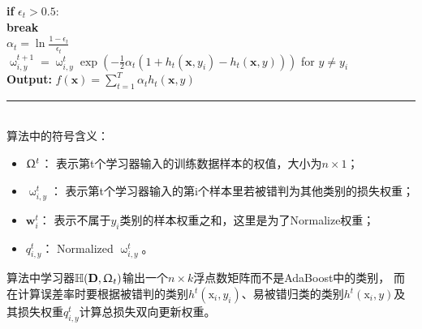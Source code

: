 \documentclass[a4paper]{article}
\begin{document}
					\hspace*{48pt}	\textbf{if} $\epsilon_t > 0.5$:\\
					\hspace*{64pt}	\textbf{break}\\
					\hspace*{48pt}	$\alpha_t = \ln\frac{1-\epsilon_t}{\epsilon_t}$\\
					\hspace*{48pt}	$\upomega_{i,y}^{t+1} = \upomega_{i,y}^t\exp(-\frac{1}{2}\alpha_t(1+h_t(\textbf{x},y_i)-h_t(\textbf{x},y)))$ for $y\neq y_i$\\
			\textbf{Output:} $f(\textbf{x}) = \sum_{t=1}^{T}\alpha_th_t(\textbf{x},y)$\\
			\noindent\rule[0.1\baselineskip]{\textwidth}{0.75pt}\\
			算法中的符号含义：
			\begin{itemize}
				\item $\Upomega^t$： 表示第t个学习器输入的训练数据样本的权值，大小为$n\times 1$；
				\item $\upomega_{i,y}^{t}$： 表示第t个学习器输入的第i个样本里若被错判为其他类别的损失权重；
				\item $\textbf{w}_i^t$： 表示不属于$y_i$类别的样本权重之和，这里是为了Normalize权重；
				\item $q_{i,y}^t$： Normalized $\upomega_{i,y}^{t}$。
			\end{itemize}
			算法中学习器$\mathbb{H}(\textbf{D}, \Upomega_t)$输出一个$n\times k$浮点数矩阵而不是AdaBoost中的类别，
			而在计算误差率时要根据被错判的类别$h^t(\text{x}_i,y_i)$、易被错归类的类别$h^t(\text{x}_i,y)$及
			其损失权重$q_{i,y}^t$计算总损失双向更新权重。
\end{document}

